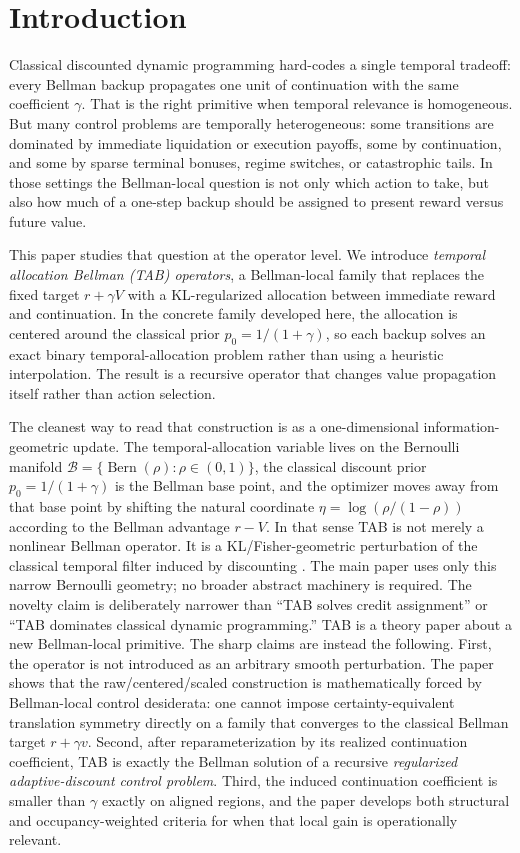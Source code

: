 \documentclass{article}
\theoremstyle{remark}
\DeclareMathOperator{\Bern}{Bern}
\begin{document}
\section{Introduction}

Classical discounted dynamic programming hard-codes a single temporal tradeoff: every Bellman backup propagates one unit of continuation with the same coefficient $\gamma$. That is the right primitive when temporal relevance is homogeneous. But many control problems are temporally heterogeneous: some transitions are dominated by immediate liquidation or execution payoffs, some by continuation, and some by sparse terminal bonuses, regime switches, or catastrophic tails. In those settings the Bellman-local question is not only which action to take, but also how much of a one-step backup should be assigned to present reward versus future value.

This paper studies that question at the operator level. We introduce \emph{temporal allocation Bellman (TAB) operators}, a Bellman-local family that replaces the fixed target $r+\gamma V$ with a KL-regularized allocation between immediate reward and continuation. In the concrete family developed here, the allocation is centered around the classical prior $p_0=1/(1+\gamma)$, so each backup solves an exact binary temporal-allocation problem rather than using a heuristic interpolation. The result is a recursive operator that changes value propagation itself rather than action selection.

The cleanest way to read that construction is as a one-dimensional information-geometric update. The temporal-allocation variable lives on the Bernoulli manifold $\mathcal B=\{\Bern(\rho):\rho\in(0,1)\}$, the classical discount prior $p_0=1/(1+\gamma)$ is the Bellman base point, and the optimizer moves away from that base point by shifting the natural coordinate $\eta=\log(\rho/(1-\rho))$ according to the Bellman advantage $r-V$. In that sense TAB is not merely a nonlinear Bellman operator. It is a KL/Fisher-geometric perturbation of the classical temporal filter induced by discounting \citep{amari2000methods,amari2016information}. The main paper uses only this narrow Bernoulli geometry; no broader abstract machinery is required.
The novelty claim is deliberately narrower than ``TAB solves credit assignment'' or ``TAB dominates classical dynamic programming.'' TAB is a theory paper about a new Bellman-local primitive. The sharp claims are instead the following. First, the operator is not introduced as an arbitrary smooth perturbation. The paper shows that the raw/centered/scaled construction is mathematically forced by Bellman-local control desiderata: one cannot impose certainty-equivalent translation symmetry directly on a family that converges to the classical Bellman target $r+\gamma v$. Second, after reparameterization by its realized continuation coefficient, TAB is exactly the Bellman solution of a recursive \emph{regularized adaptive-discount control problem}. Third, the induced continuation coefficient is smaller than $\gamma$ exactly on aligned regions, and the paper develops both structural and occupancy-weighted criteria for when that local gain is operationally relevant.
\end{document}
